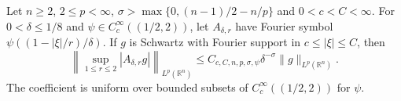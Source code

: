 Let $n\ge2$, $2\le p<\infty$, $\sigma>\max\{0,(n-1)/2-n/p\}$ and $0<c<C<\infty$. For $0<\delta\le1/8$ and $\psi\in C_c^\infty((1/2,2))$, let $A_{\delta,r}$ have Fourier symbol $\psi((1-|\xi|/r)/\delta)$. If $g$ is Schwartz with Fourier support in $c\le|\xi|\le C$, then
\[
\left\|\sup_{1\le r\le2}|A_{\delta,r}g|\right\|_{L^p(\mathbb R^n)}
\le C_{c,C,n,p,\sigma,\psi}\delta^{-\sigma}\|g\|_{L^p(\mathbb R^n)} .
\]
The coefficient is uniform over bounded subsets of $C_c^\infty((1/2,2))$ for $\psi$.
